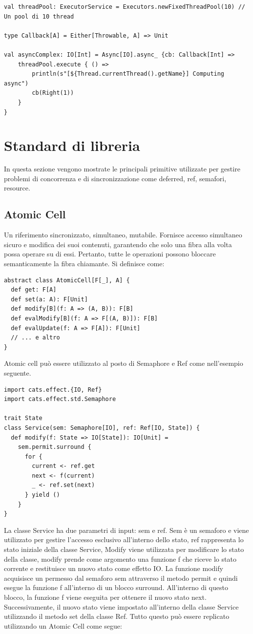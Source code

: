 \begin{verbatim}
val threadPool: ExecutorService = Executors.newFixedThreadPool(10) // Un pool di 10 thread

type Callback[A] = Either[Throwable, A] => Unit
    
val asyncComplex: IO[Int] = Async[IO].async_ {cb: Callback[Int] =>
    threadPool.execute { () =>
        println(s"[${Thread.currentThread().getName}] Computing async")
        cb(Right(1))
    }
}
\end{verbatim}

\section{Standard di libreria}
In questa sezione vengono mostrate le principali primitive utilizzate per
gestire problemi di concorrenza e di sincronizzazione come deferred, ref, semafori, resource.

\subsection{Atomic Cell}
Un riferimento sincronizzato, simultaneo, mutabile. Fornisce accesso simultaneo sicuro e modifica dei suoi contenuti, garantendo che solo una fibra alla volta possa operare su di essi. Pertanto, tutte le operazioni possono bloccare semanticamente la fibra chiamante. Si definisce come:
\begin{verbatim}
abstract class AtomicCell[F[_], A] {
  def get: F[A]
  def set(a: A): F[Unit]
  def modify[B](f: A => (A, B)): F[B]
  def evalModify[B](f: A => F[(A, B)]): F[B]
  def evalUpdate(f: A => F[A]): F[Unit]
  // ... e altro
}
\end{verbatim}
\noindent Atomic  cell può essere utilizzato al posto di Semaphore e Ref come nell'esempio seguente.
\begin{verbatim}
import cats.effect.{IO, Ref}
import cats.effect.std.Semaphore

trait State
class Service(sem: Semaphore[IO], ref: Ref[IO, State]) {
  def modify(f: State => IO[State]): IO[Unit] = 
    sem.permit.surround {
      for {
        current <- ref.get
        next <- f(current)
        _ <- ref.set(next) 
      } yield ()
    }
}

\end{verbatim}

\noindent La classe Service ha due parametri di input: sem e ref. Sem è un semaforo e viene utilizzato per gestire l'accesso esclusivo all'interno dello stato, ref rappresenta lo stato iniziale della classe Service, Modify viene utilizzata per modificare lo stato della classe, modify prende come argomento una funzione f che riceve lo stato corrente e restituisce un nuovo stato come effetto IO. La funzione modify acquisisce un permesso dal semaforo sem attraverso il metodo permit e quindi esegue la funzione f all'interno di un blocco surround. All'interno di questo blocco, la funzione f viene eseguita per ottenere il nuovo stato next. Successivamente, il nuovo stato viene impostato all'interno della classe Service utilizzando il metodo set della classe Ref. Tutto questo può essere replicato utilizzando un Atomic Cell come segue:

